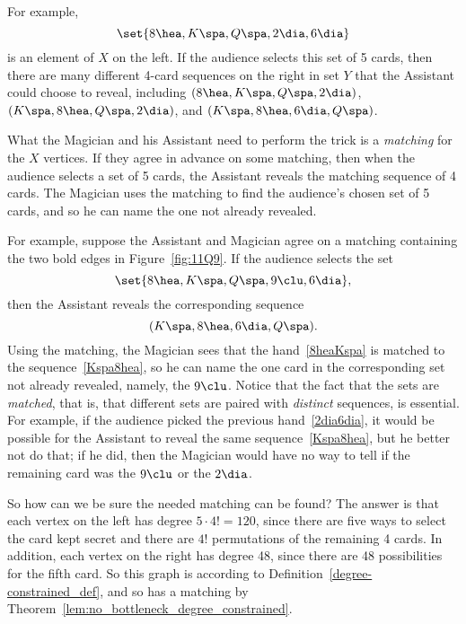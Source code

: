 For example,
\begin{equation}\label{2dia6dia}
\set{ 8 \hea, K \spa, Q \spa, 2 \dia, 6 \dia }
\end{equation}
is an element of $X$ on the left.  If the audience selects this set of 5
cards, then there are many different 4-card sequences on the right in set
$Y$ that the Assistant could choose to reveal, including $(8 \hea, K \spa,
Q \spa, 2 \dia)$, $(K \spa, 8 \hea, Q \spa, 2 \dia)$, and $(K \spa, 8
\hea, 6 \dia, Q \spa)$.

What the Magician and his Assistant need to perform the trick is a
\emph{matching} for the $X$ vertices.  If they agree in advance on
some matching, then when the audience selects a set of 5 cards, the
Assistant reveals the matching sequence of 4 cards.  The Magician uses
the matching to find the audience's chosen set of 5 cards, and so he
can name the one not already revealed.

For example, suppose the Assistant and Magician agree on a matching
containing the two bold edges in Figure~\ref{fig:11Q9}.  If the
audience selects the set
\begin{equation}\label{8heaKspa}
\set{8 \hea, K \spa, Q \spa, 9 \clu, 6 \dia},
\end{equation}
then the Assistant reveals the corresponding sequence
\begin{equation}\label{Kspa8hea}
(K \spa, 8 \hea, 6 \dia, Q \spa).
\end{equation}
Using the matching, the Magician sees that the hand~\eqref{8heaKspa}
is matched to the sequence~\eqref{Kspa8hea}, so he can name the one
card in the corresponding set not already revealed, namely, the $9
\clu$.  Notice that the fact that the sets are \emph{matched}, that
is, that different sets are paired with \emph{distinct} sequences, is
essential.  For example, if the audience picked the previous
hand~\eqref{2dia6dia}, it would be possible for the Assistant to
reveal the same sequence~\eqref{Kspa8hea}, but he better not do that;
if he did, then the Magician would have no way to tell if the
remaining card was the $9 \clu$ or the $2 \dia$.

So how can we be sure the needed matching can be found?  The answer is
that each vertex on the left has degree $5 \cdot 4! = 120$, since
there are five ways to select the card kept secret and there are $4!$
permutations of the remaining 4 cards.  In addition, each vertex on
the right has degree 48, since there are 48 possibilities for the
fifth card.  So this graph is \emph{}
according to Definition~\ref{degree-constrained_def}, and so
has a matching by Theorem~\ref{lem:no_bottleneck_degree_constrained}.


